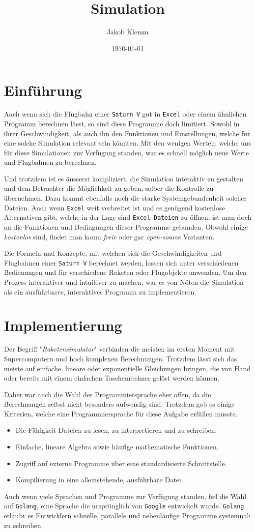 \documentclass[11pt]{article}
\author{Jakob Klemm}
\date{\today}
\title{Simulation}
\begin{document}
\maketitle
\tableofcontents

\section{Einführung}
\label{sec:org303e3d8}
Auch wenn sich die Flugbahn einer \texttt{Saturn V} gut in \texttt{Excel} oder einem ähnlichen
Programm berechnen lässt, so sind diese Programme doch limitiert. Sowohl in
ihrer Geschwindigkeit, als auch ihn den Funktionen und Einstellungen, welche für
eine solche Simulation relevant sein könnten. Mit den wenigen Werten, welche uns
für diese Simulationen zur Verfügung standen, war es schnell möglich neue Werte
und Flugbahnen zu berechnen.

Und trotzdem ist es äusserst kompliziert, die Simulation interaktiv zu gestalten
und dem Betrachter die Möglichkeit zu geben, selber die Kontrolle zu übernehmen.
Dazu kommt ebenfalls noch die starke Systemgebundenheit solcher Dateien. Auch
wenn \texttt{Excel} weit verbreitet ist und es genügend kostenlose Alternativen gibt,
welche in der Lage sind \texttt{Excel-Dateien} zu öffnen, ist man doch an die Funktionen
und Bedingungen dieser Programme gebunden. Obwohl einige \emph{kostenlos} sind, findet
man kaum \emph{freie} oder gar \emph{open-source} Varianten.

Die Formeln und Konzepte, mit welchen sich die Geschwindigkeiten und Flugbahnen
einer \texttt{Saturn V} berechnet werden, lassen sich unter verschiedenen Bedienungen und
für verschiedene Raketen oder Flugobjekte anwenden. Um den Prozess interaktiver
und intuitiver zu machen, war es von Nöten die Simulation als ein ausführbares,
interaktives Programm zu implementieren.
\section{Implementierung}
\label{sec:orgc3fd095}
Der Begriff "\emph{Raketensimulator}" verbinden die meisten im ersten Moment mit
Supercomputern und hoch komplexen Berechnungen. Trotzdem lässt sich das meiste
auf einfache, lineare oder exponentielle Gleichungen bringen, die von Hand oder
bereits mit einem einfachen Taschenrechner gelöst werden können.

Daher war auch die Wahl der Programmiersprache eher offen, da die Berechnungen
selbst nicht besonders aufwendig sind. Trotzdem gab es einige Kriterien, welche
eine Programmiersprache für diese Aufgabe erfüllen musste.
\begin{itemize}
\item Die Fähigkeit Dateien zu lesen, zu interpretieren und zu schreiben.
\item Einfache, lineare Algebra sowie häufige mathematische Funktionen.
\item Zugriff auf externe Programme über eine standardisierte Schnittstelle.
\item Kompilierung in eine alleinstehende, ausführbare Datei.
\end{itemize}

Auch wenn viele Sprachen und Programme zur Verfügung standen, fiel die Wahl auf
\texttt{Golang}, eine Sprache die ursprünglich von \texttt{Google} entwickelt wurde. \texttt{Golang}
erlaubt es Entwicklern schnelle, parallele und nebenläufige Programme systemnah
zu schreiben.
\end{document}
